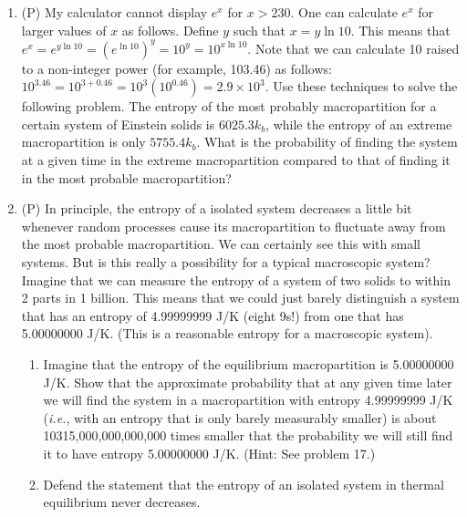 \begin{enumerate}
\item(P) My calculator cannot display $e^x$ for $x> 230$.  One can calculate $e^x$ for larger 
values of $x$ as follows.  Define $y$ such that $x = y \ln 10$.  This means that 
$e^x = e^{y\ln 10} = (e^{\ln10})^y = 10^y = 10^{x\ln 10}$.  
Note that we can calculate 10 raised to a 
non-integer power (for example, 103.46) as follows:  
$10^{3.46} = 10^{3+0.46} = 10^3(10^{0.46}) = 2.9 \times 10^3$.  
Use these techniques to solve the following problem.  The entropy of the most probably 
macropartition for a certain system of Einstein solids is $6025.3k_b$, while the entropy 
of an extreme macropartition is only $5755.4k_b$.  What is the probability of finding the 
system at a given time in the extreme macropartition compared to that of finding it in 
the most probable macropartition?

\item(P) In principle, the entropy of a isolated system decreases a little bit whenever 
random processes cause its macropartition to fluctuate away from the most probable 
macropartition.  We can certainly see this with small systems. 
But is this really a possibility for a typical macroscopic system?  Imagine that 
we can measure the entropy of a system of two solids to within 2 parts in 1 billion.  
This means that we could just barely distinguish a system that has an entropy of 
4.99999999 J/K (eight 9s!) from one that has 5.00000000 J/K.  (This is a reasonable 
entropy for a macroscopic system).
\begin{enumerate}
\item Imagine that the entropy of the equilibrium macropartition is 5.00000000 J/K.  
Show that the approximate probability that at any given time later we will find the 
system in a macropartition with entropy 4.99999999 J/K ({\it i.e.}, with an entropy that 
is only barely measurably smaller) is about 10315,000,000,000,000 times smaller that 
the probability we will still find it to have entropy 5.00000000 J/K. (Hint:  See problem 17.)
\item Defend the statement that the entropy of an isolated system in thermal equilibrium 
never decreases.
\end{enumerate}

\end{enumerate}



